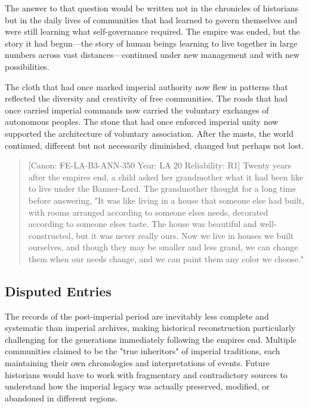 The answer to that question would be written not in the chronicles of
historians but in the daily lives of communities that had learned to
govern themselves and were still learning what self-governance required.
The empire was ended, but the story it had begun---the story of human
beings learning to live together in large numbers across vast
distances---continued under new management and with new possibilities.

The cloth that had once marked imperial authority now flew in patterns
that reflected the diversity and creativity of free communities. The
roads that had once carried imperial commands now carried the voluntary
exchanges of autonomous peoples. The stone that had once enforced
imperial unity now supported the architecture of voluntary association.
After the masts, the world continued, different but not necessarily
diminished, changed but perhaps not lost.

\begin{quote}
{[}Canon: FE-LA-B3-ANN-350 \textbar{} Year: LA 20 \textbar{}
Reliability: R1{]} Twenty years after the empire\textquotesingle s end,
a child asked her grandmother what it had been like to live under the
Banner-Lord. The grandmother thought for a long time before answering,
"It was like living in a house that someone else had built, with rooms
arranged according to someone else\textquotesingle s needs, decorated
according to someone else\textquotesingle s taste. The house was
beautiful and well-constructed, but it was never really ours. Now we
live in houses we built ourselves, and though they may be smaller and
less grand, we can change them when our needs change, and we can paint
them any color we choose."
\end{quote}

\subsection{Disputed Entries}\label{disputed-entries}

The records of the post-imperial period are inevitably less complete and
systematic than imperial archives, making historical reconstruction
particularly challenging for the generations immediately following the
empire\textquotesingle s end. Multiple communities claimed to be the
"true inheritors" of imperial traditions, each maintaining their own
chronologies and interpretations of events. Future historians would have
to work with fragmentary and contradictory sources to understand how the
imperial legacy was actually preserved, modified, or abandoned in
different regions.

